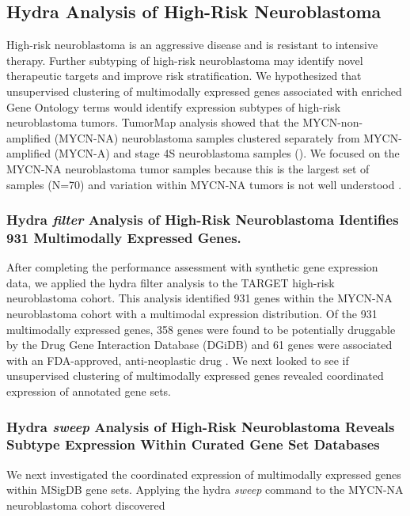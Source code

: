 \documentclass[10pt,letterpaper]{article}
\begin{document}
\subsection*{Hydra Analysis of High-Risk Neuroblastoma}
High-risk neuroblastoma is an aggressive disease and is resistant to intensive therapy. Further subtyping of high-risk neuroblastoma may identify novel therapeutic targets and improve risk stratification. We hypothesized that unsupervised clustering of multimodally expressed genes associated with enriched Gene Ontology terms would identify expression subtypes of high-risk neuroblastoma tumors. TumorMap  analysis \cite{newtonTumorMapExploringMolecular2017} showed that the MYCN-non-amplified (MYCN-NA) neuroblastoma samples clustered separately from MYCN-amplified (MYCN-A) and stage 4S neuroblastoma samples (). We focused on the MYCN-NA neuroblastoma tumor samples because this is the largest set of samples (N=70) and variation within MYCN-NA tumors is not well understood \cite{morgensternChallengeDefiningUltrahighrisk2019}.

\subsubsection*{Hydra \textit{filter} Analysis of High-Risk Neuroblastoma Identifies 931 Multimodally Expressed Genes.}
After completing the performance assessment with synthetic gene expression data, we applied the hydra filter analysis to the TARGET high-risk neuroblastoma cohort. This analysis identified 931 genes within the MYCN-NA neuroblastoma cohort with a multimodal expression distribution. Of the 931 multimodally expressed genes, 358 genes were found to be potentially druggable by the Drug Gene Interaction Database (DGiDB) and 61 genes were associated with an FDA-approved, anti-neoplastic drug  \cite{cotto2017dgidb}. We next looked to see if unsupervised clustering of multimodally expressed genes revealed coordinated expression of annotated gene sets.

\subsubsection*{Hydra \textit{sweep} Analysis of High-Risk Neuroblastoma Reveals Subtype Expression Within Curated Gene Set Databases}
We next investigated the coordinated expression of multimodally expressed genes within MSigDB gene sets. Applying the hydra \textit{sweep} command to the MYCN-NA neuroblastoma cohort discovered 
\end{document}
